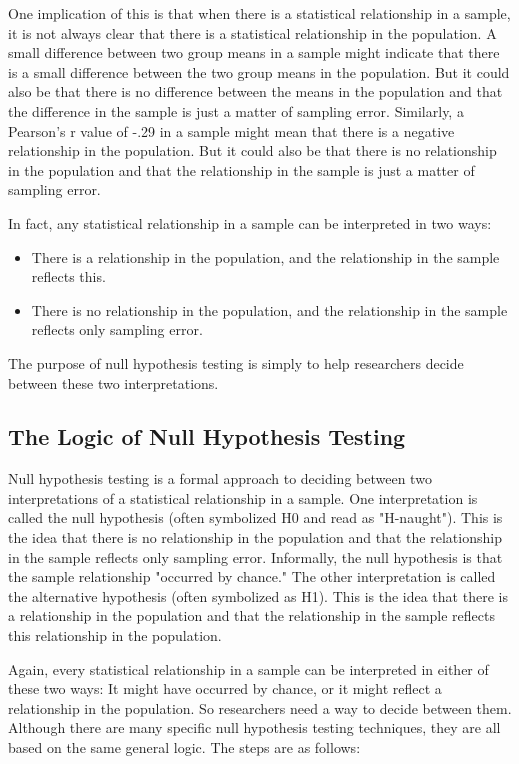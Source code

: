 One implication of this is that when there is a statistical relationship in a sample, it is not always clear that there is a statistical relationship in the population. A small difference between two group means in a sample might indicate that there is a small difference between the two group means in the population. But it could also be that there is no difference between the means in the population and that the difference in the sample is just a matter of sampling error. Similarly, a Pearson's r value of -.29 in a sample might mean that there is a negative relationship in the population. But it could also be that there is no relationship in the population and that the relationship in the sample is just a matter of sampling error.


In fact, any statistical relationship in a sample can be interpreted in two ways:


\begin{itemize}
\item There is a relationship in the population, and the relationship in the sample reflects this.

\item There is no relationship in the population, and the relationship in the sample reflects only sampling error.

\end{itemize}

The purpose of null hypothesis testing is simply to help researchers decide between these two interpretations.


\subsection{The Logic of Null Hypothesis Testing}

Null hypothesis testing is a formal approach to deciding between two interpretations of a statistical relationship in a sample. One interpretation is called the null hypothesis (often symbolized H0 and read as "H-naught"). This is the idea that there is no relationship in the population and that the relationship in the sample reflects only sampling error. Informally, the null hypothesis is that the sample relationship "occurred by chance." The other interpretation is called the alternative hypothesis (often symbolized as H1). This is the idea that there is a relationship in the population and that the relationship in the sample reflects this relationship in the population.


Again, every statistical relationship in a sample can be interpreted in either of these two ways: It might have occurred by chance, or it might reflect a relationship in the population. So researchers need a way to decide between them. Although there are many specific null hypothesis testing techniques, they are all based on the same general logic. The steps are as follows:

